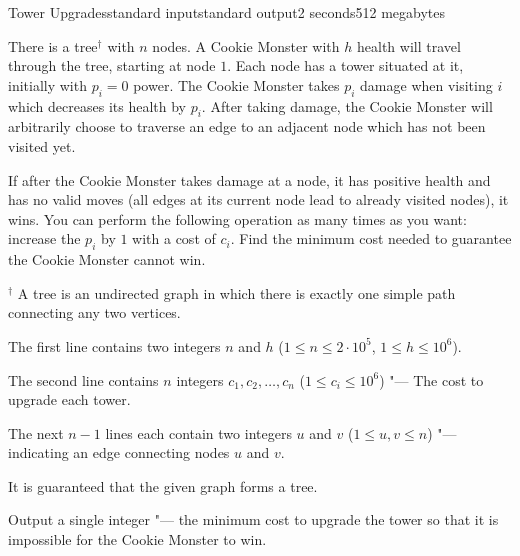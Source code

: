 \begin{problem}{Tower Upgrades}{standard input}{standard output}{2 seconds}{512 megabytes}

There is a tree$^\dagger$ with $n$ nodes. A Cookie Monster with $h$ health will travel through the tree, starting at node $1$. Each node has a tower situated at it, initially with $p_i=0$ power. The Cookie Monster takes $p_i$ damage when visiting $i$ which decreases its health by $p_i$. After taking damage, the Cookie Monster will arbitrarily choose to traverse an edge to an adjacent node which has not been visited yet. 

If after the Cookie Monster takes damage at a node, it has positive health and has no valid moves (all edges at its current node lead to already visited nodes), it wins. You can perform the following operation as many times as you want: increase the $p_i$ by $1$ with a cost of $c_i$. Find the minimum cost needed to guarantee the Cookie Monster cannot win.

$^\dagger$ A tree is an undirected graph in which there is exactly one simple path connecting any two vertices.

\InputFile
The first line contains two integers $n$ and $h$ ($1 \le n \le 2 \cdot 10^5$, $1 \le h \le 10^6$).

The second line contains $n$ integers $c_1, c_2, \ldots, c_n$ ($1 \le c_i \le 10^6$) "--- The cost to upgrade each tower.

The next $n-1$ lines each contain two integers $u$ and $v$ ($1 \le u, v \le n$) "--- indicating an edge connecting nodes $u$ and $v$.

It is guaranteed that the given graph forms a tree.

\OutputFile
Output a single integer "--- the minimum cost to upgrade the tower so that it is impossible for the Cookie Monster to win.

\Examples

\begin{example}
%
%
\end{example}


\end{problem}
